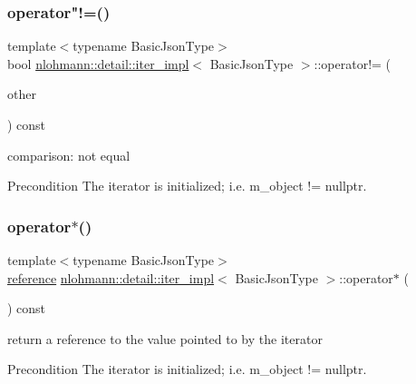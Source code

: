 \subsubsection{\texorpdfstring{operator"!=()}{operator!=()}}
{\footnotesize\ttfamily template$<$typename Basic\+Json\+Type$>$ \\
bool \mbox{\hyperlink{classnlohmann_1_1detail_1_1iter__impl}{nlohmann\+::detail\+::iter\+\_\+impl}}$<$ Basic\+Json\+Type $>$\+::operator!= (\begin{DoxyParamCaption}\item[{const \mbox{\hyperlink{classnlohmann_1_1detail_1_1iter__impl}{iter\+\_\+impl}}$<$ Basic\+Json\+Type $>$ \&}]{other }\end{DoxyParamCaption}) const\hspace{0.3cm}{\ttfamily [inline]}}



comparison\+: not equal 

\begin{DoxyPrecond}{Precondition}
The iterator is initialized; i.\+e. {\ttfamily m\+\_\+object != nullptr}. 
\end{DoxyPrecond}
\mbox{\label{classnlohmann_1_1detail_1_1iter__impl_a5ca57856d9bba54a5fc51cee891de827}} 
\subsubsection{\texorpdfstring{operator$\ast$()}{operator*()}}
{\footnotesize\ttfamily template$<$typename Basic\+Json\+Type$>$ \\
\mbox{\hyperlink{classnlohmann_1_1detail_1_1iter__impl_a5be8001be099c6b82310f4d387b953ce}{reference}} \mbox{\hyperlink{classnlohmann_1_1detail_1_1iter__impl}{nlohmann\+::detail\+::iter\+\_\+impl}}$<$ Basic\+Json\+Type $>$\+::operator$\ast$ (\begin{DoxyParamCaption}{ }\end{DoxyParamCaption}) const\hspace{0.3cm}{\ttfamily [inline]}}



return a reference to the value pointed to by the iterator 

\begin{DoxyPrecond}{Precondition}
The iterator is initialized; i.\+e. {\ttfamily m\+\_\+object != nullptr}. 
\end{DoxyPrecond}
\mbox{\label{classnlohmann_1_1detail_1_1iter__impl_a8ef76aeb5a5032768f0f61f48ac189c0}} 

